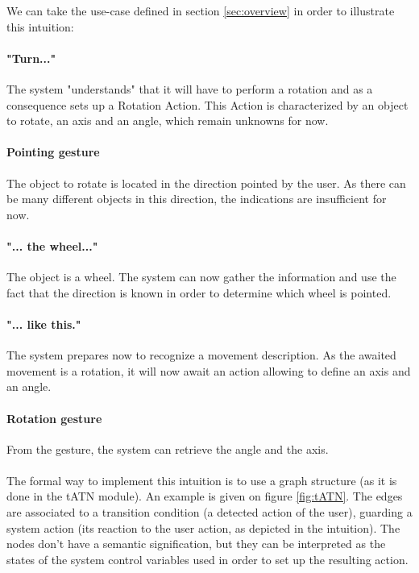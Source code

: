 \documentclass[a4paper]{article}
\begin{document}
We can take the use-case defined in section \ref{sec:overview} in order to illustrate this intuition:

\paragraph{"Turn..."} The system "understands" that it will have to perform a rotation and as a consequence sets up a Rotation Action. This Action is characterized by an object to rotate, an axis and an angle, which remain unknowns for now.

\paragraph{Pointing gesture} The object to rotate is located in the direction pointed by the user. As there can be many different objects in this direction, the indications are insufficient for now.

\paragraph{"... the wheel..."} The object is a wheel. The system can now gather the information and use the fact that the direction is known in order to determine which wheel is pointed.

\paragraph{"... like this."} The system prepares now to recognize a movement description. As the awaited movement is a rotation, it will now await an action allowing to define an axis and an angle.

\paragraph{Rotation gesture} From the gesture, the system can retrieve the angle and the axis.
\\
\\
The formal way to implement this intuition is to use a graph structure (as it is done in the tATN module). An example is given on figure \ref{fig:tATN}. The edges are associated to a transition condition (a detected action of the user), guarding a system action (its reaction to the user action, as depicted in the intuition). The nodes don't have a semantic signification, but they can be interpreted as the states of the system control variables used in order to set up the resulting action.
\end{document}
